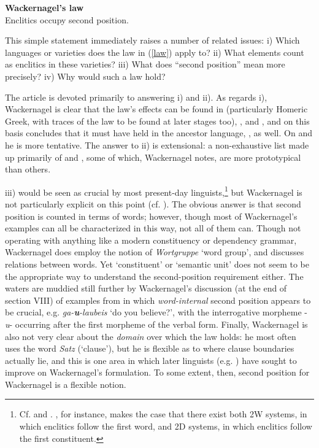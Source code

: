\documentclass[output=paper]{../langscibook}
\begin{document}
\begin{exe}
\ex\label{law} \textbf{Wackernagel's law}\\
Enclitics occupy second position.
\end{exe}

This simple statement immediately raises a number of related issues: i) Which languages or varieties does the law in (\ref{law}) apply to? ii) What elements count as enclitics in these varieties? iii) What does ``second position'' mean more precisely? iv) Why would such a law hold?

The article is devoted primarily to answering i) and ii). As regards i), Wackernagel is clear that the law's effects can be found in  (particularly Homeric Greek, with traces of the law to be found at later stages too), , and , and on this basis concludes that it must have held in the ancestor language, , as well. On  and  he is more tentative. The answer to ii) is extensional: a non-exhaustive list made up primarily of  and , some of which, Wackernagel notes, are more prototypical than others.

iii) would be seen as crucial by most present-day linguists,\footnote{Cf. \citet[18--20]{Zwicky1977} and \citet[72--73]{Anderson1993}. \citet{Halpern1995}, for instance, makes the case that there exist both 2W systems, in which enclitics follow the first word, and 2D systems, in which enclitics follow the first constituent.} but Wackernagel is not particularly explicit on this point (cf. \citealp[11]{AzizHanna2015}). The obvious answer is that second position is counted in terms of words; however, though most of Wackernagel's examples can all be characterized in this way, not all of them can. Though not operating with anything like a modern constituency or dependency grammar, Wackernagel does employ the notion of \textit{Wortgruppe} `word group', and discusses relations between words. Yet `constituent' or `semantic unit' does not seem to be the appropriate way to understand the second-position requirement either. The waters are muddied still further by Wackernagel's discussion (at the end of section VIII) of examples from  in which \textit{word-internal} second position appears to be crucial, e.g.  \textit{ga-\textbf{u}-laubeis} `do you believe?', with the interrogative morpheme -\textit{u}- occurring after the first morpheme of the verbal form. Finally, Wackernagel is also not very clear about the \emph{domain} over which the law holds: he most often uses the word \emph{Satz} (`clause'), but he is flexible as to where clause boundaries actually lie, and this is one area in which later linguists (e.g. \citealp{Fraenkel1932,Fraenkel1933,Fraenkel1965,Ruijgh1990}) have sought to improve on Wackernagel's formulation. To some extent, then, second position for Wackernagel is a flexible notion.
\end{document}
